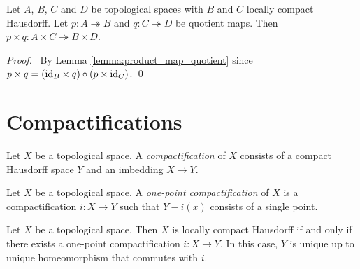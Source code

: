 \begin{theorem}
    Let $A$, $B$, $C$ and $D$ be topological spaces with $B$ and $C$ locally
    compact Hausdorff. Let $p : A \twoheadrightarrow B$ and $q : C
    \twoheadrightarrow D$ be quotient maps. Then $p \times q : A \times C
    \twoheadrightarrow B \times D$.
\end{theorem}

\begin{proof}
    \pf\ By Lemma \ref{lemma:product_map_quotient} since $p \times q =
    (\mathrm{id}_{B} \times q) \circ (p \times \mathrm{id}_{C})$. \qed
\end{proof}

\section{Compactifications}

\begin{definition}[Compactification]
    Let $X$ be a topological space. A \emph{compactification} of $X$ consists of a compact Hausdorff
    space $Y$ and an imbedding $X \rightarrow Y$.
\end{definition}

\begin{definition}
    Let $X$ be a topological space. A \emph{one-point compactification} of $X$ is a compactification
    $i : X \rightarrow Y$ such that $Y - i(x)$ consists of a single point.
\end{definition}

\begin{theorem}
    Let $X$ be a topological space. Then $X$ is locally compact Hausdorff if and only if there exists
    a one-point compactification $i : X \rightarrow Y$. In this case,
    $Y$ is unique up to unique homeomorphism that commutes with $i$.
\end{theorem}

